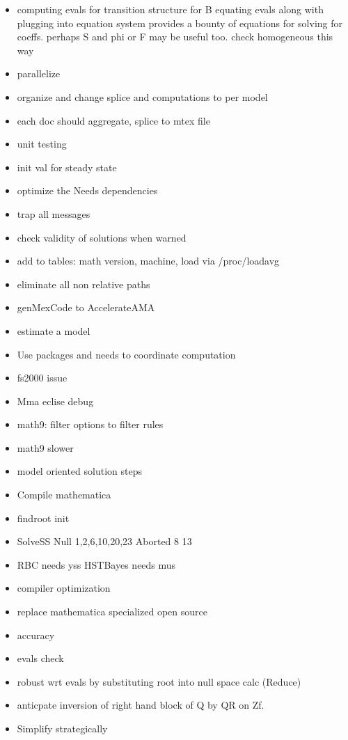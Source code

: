 \documentclass[12pt]{article}
\begin{document}
  \begin{itemize}
  \item computing evals for transition structure for B equating evals along with plugging into equation system provides a bounty of equations for solving for coeffs.  perhaps S and phi or F may be useful too.  check homogeneous this way
  \item parallelize
  \item organize and change splice and computations to per model
  \item each doc should aggregate, splice to mtex file
  \item unit testing
  \item init val for steady state
  \item optimize the Needs dependencies
  \item trap all messages
  \item check validity of solutions when  warned
  \item add to tables: math version, machine, load via /proc/loadavg
  \item eliminate all non relative paths
  \item genMexCode to AccelerateAMA
  \item estimate a model
  \item Use packages and needs to coordinate computation
  \item fs2000 issue
  \item Mma eclise debug
  \item math9: filter options to filter rules
  \item math9 slower
  \item model oriented solution steps
  \item Compile mathematica
  \item findroot init
  \item SolveSS Null 1,2,6,10,20,23 Aborted 8 13
  \item RBC needs yss HSTBayes needs mus
  \item compiler optimization
  \item replace mathematica specialized open source 
  \item accuracy
  \item evals check
  \item robust wrt evals by substituting root into null space calc (Reduce)
  \item anticpate inversion of right hand block of Q by QR on Zf.
  \item Simplify strategically

\end{itemize}
\end{document}
